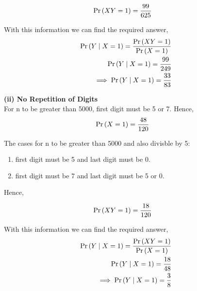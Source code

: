 \documentclass{article}
\begin{document}
\begin{align}
	\Pr\left(XY=1\right) &=\frac{99}{625}
\end{align}

With this information we can find the required answer,
\begin{align}
	\Pr\left(Y \mid X=1\right)=\frac{\Pr\left(XY=1\right) }{\Pr\left(X=1\right)}\\
	\Pr\left(Y \mid X=1\right)=\frac{99}{249}\\	
	\implies \Pr\left(Y \mid X=1\right)=\frac{33}{83}	
\end{align}


\textbf{(ii) No Repetition of Digits}\\
For n to be greater than 5000, first digit must be 5 or 7. Hence,
\begin{align}
	\Pr\left(X=1\right) &=\frac{48}{120}
\end{align}

The cases for n to be greater than 5000 and also divisble by 5:
\begin{enumerate}
\item first digit must be 5 and last digit must be 0.
\item first digit must be 7 and last digit must be 5 or 0.
\end{enumerate}
Hence,

\begin{align}
	\Pr\left(XY=1\right) &=\frac{18}{120}
\end{align}

With this information we can find the required answer,
\begin{align}
	\Pr\left(Y \mid X=1\right)=\frac{\Pr\left(XY=1\right) }{\Pr\left(X=1\right)}\\
	\Pr\left(Y \mid X=1\right)=\frac{18}{48}\\	
	\implies \Pr\left(Y \mid X=1\right)=\frac{3}{8}	
\end{align}
\end{document}
